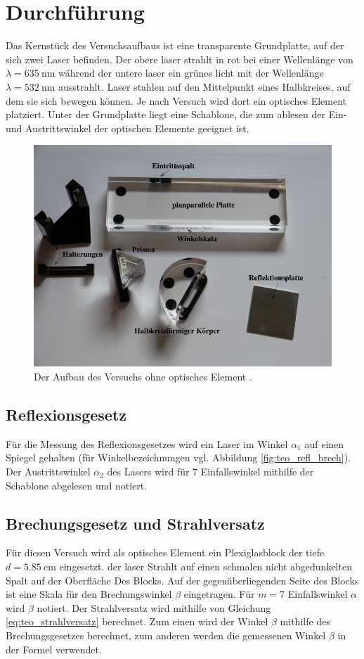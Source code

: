 \section{Durchführung}
Das Kernstück des Versuchsaufbaus ist eine transparente Grundplatte, auf der sich zwei Laser befinden. 
Der obere laser strahlt in rot bei einer Wellenlänge von $\lambda = \qty{635}{\nano\meter}$ während der
untere laser ein grünes licht mit der Wellenlänge $\lambda = \qty{532}{\nano\meter}$ ausstrahlt.
Laser stahlen auf den Mittelpunkt eines Halbkreises, auf dem sie sich bewegen können.
Je nach Versuch wird dort ein optisches Element platziert.
Unter der Grundplatte liegt eine Schablone, die zum ablesen der Ein- und Austrittswinkel der optischen
Elemente geeignet ist.
\begin{figure}
    \centering
    \includegraphics{Abbildungen/Aufbau.png}
    \caption{Der Aufbau des Versuchs ohne optisches Element \cite{man:v400}.}
\end{figure}

\subsection{Reflexionsgesetz}
Für die Messung des Reflexionsgesetzes wird ein Laser im Winkel
$\alpha_1$ auf einen Spiegel gehalten (für Winkelbezeichnungen vgl. Abbildung \ref{fig:teo_refl_brech}).
Der Austrittswinkel $\alpha_2$ des Lasers wird für 7 Einfallswinkel mithilfe der Schablone abgelesen und notiert.

\subsection{Brechungsgesetz und Strahlversatz}
Für diesen Versuch wird als optisches Element ein Plexiglasblock der tiefe $d = \qty{5.85}{\cm}$ eingesetzt.
der laser Strahlt auf einen schmalen nicht abgedunkelten Spalt auf der Oberfläche Des Blocks.
Auf der gegenüberliegenden Seite des Blocks ist eine Skala für den Brechungswinkel $\beta$ eingetragen.
Für $m= 7$ Einfallswinkel $\alpha$ wird $\beta$ notiert.
Der Strahlversatz wird mithilfe von Gleichung \eqref{eq:teo_strahlversatz} berechnet.
Zum einen wird der Winkel $\beta$ mithilfe des Brechungsgesetzes berechnet,
zum anderen werden die gemessenen Winkel $\beta$ in der Formel verwendet.

